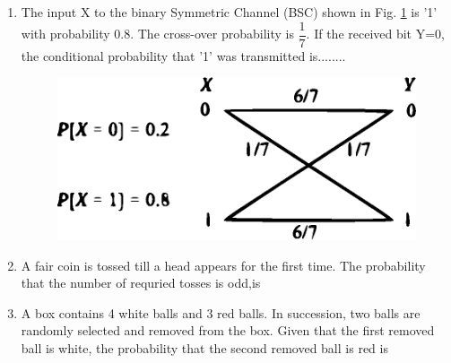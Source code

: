 \documentclass[journal,12pt,twocolumn]{IEEEtran}
\begin{document}
\begin{enumerate}
\begin{enumerate}
\end{enumerate}

\item The input X to the binary Symmetric Channel (BSC) shown in Fig. \ref{fig:7} is '1' with probability 0.8. The cross-over probability is $\dfrac{1}{7}$. If the received bit Y=0, the conditional probability that '1' was transmitted is........\\


\begin{figure}[!h]
\includegraphics[width=\columnwidth]{./figs/figure7.eps}
\caption{}
\label{fig:7}
\end{figure}
%
\solution


\item A fair coin is tossed till a head appears for the first time. The probability that the number of requried tosses is odd,is
\begin{enumerate}
\end{enumerate}

\item A box contains 4 white balls and 3 red balls. In succession, two balls are randomly selected and removed from the box. Given that the first removed ball is white, the probability that the second removed ball is red is
\begin{enumerate}
\end{enumerate}
\end{enumerate}
\end{document}
